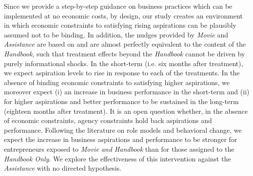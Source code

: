 \documentclass[11.5pt]{article}
\begin{document}
Since we provide a step-by-step guidance on business practices which can be implemented at no economic costs, by design, our study creates an environment in which economic constraints to satisfying rising aspirations can be plausibly assumed not to be binding. In addition, %
the nudges provided by \emph{Movie} and \emph{Assistance} are based on and are almost perfectly equivalent to the content of the \emph{Handbook}, such that treatment effects beyond the \emph{Handbook} cannot be driven by purely informational shocks. In the short-term (i.e. six months after treatment), we expect aspiration levels to rise in response to each of the treatments. In the absence of binding economic constraints to satisfying higher aspirations, we moreover expect (i) an increase in business performance in the short-term and (ii) for higher aspirations and better performance to be sustained in the long-term (eighteen months after treatment). It is an open question whether, in the absence of economic constraints, agency constraints hold back aspirations and performance. Following the literature on role models and behavioral change, we expect the increase in business aspirations and performance to be stronger for entrepreneurs exposed to \emph{Movie and Handbook} than for those assigned to the \emph{Handbook Only}. We explore the effectiveness of this intervention against the \emph{Assistance} with no directed hypothesis. %

\end{document}
